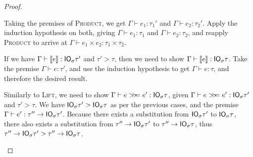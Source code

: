 \begin{proof}
\begin{description}
    Taking the premises of \textsc{Product}, we get $\Gamma \vdash e_1 : \tau_1'$
    and $\Gamma \vdash e_2 : \tau_2'$. Apply the induction hypothesis on both, giving
    $\Gamma \vdash e_1 : \tau_1$ and $\Gamma \vdash e_2 : \tau_2$, and reapply \textsc{Product} to
    arrive at $\Gamma \vdash e_1 \times e_2 : \tau_1 \times \tau_2$.
  \item[\textmd{\boxed{\textsc{Lift}}}]
    If we have $\Gamma \vdash [\![ e]\!] : \mathsf{IO}_\sigma \tau'$ and $\tau' > \tau$, then we need to
    show $\Gamma \vdash [\![ e]\!] : \mathsf{IO}_\sigma \tau$. Take the premise $\Gamma \vdash e : \tau'$,
    and use the induction hypothesis to get $\Gamma \vdash e : \tau$, and therefore
    the desired result.
  \item[\textmd{\boxed{\textsc{Bind}}}]
    Similarly to \textsc{Lift}, we need to show $\Gamma \vdash e >\!\!>\!\!= e' :
    \mathsf{IO}_\sigma \tau$, given $\Gamma \vdash e >\!\!>\!\!= e' : \mathsf{IO}_\sigma \tau'$ and $\tau' > \tau$.
    We have $\mathsf{IO}_\sigma \tau' > \mathsf{IO}_\sigma \tau$ as per the previous cases, and the
    premise $\Gamma \vdash e' : \tau'' \rightarrow \mathsf{IO}_\sigma \tau'$. Because there exists a
    substitution from $\mathsf{IO}_\sigma \tau'$ to $\mathsf{IO}_\sigma \tau$, there also exists a
    substitution from $\tau'' \rightarrow \mathsf{IO}_\sigma \tau'$ to $\tau'' \rightarrow \mathsf{IO}_\sigma \tau$, thus
    $\tau'' \rightarrow \mathsf{IO}_\sigma \tau' > \tau'' \rightarrow \mathsf{IO}_\sigma \tau$.


\end{description}
\end{proof}
